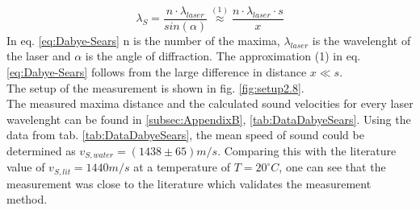         \begin{equation}
            \lambda_S = \frac{n \cdot \lambda_{laser}}{sin(\alpha)} \overset{(1)}{\approx} \frac{n \cdot \lambda_{laser} \cdot s}{x}
        \label{eq:Dabye-Sears}
        \end{equation}
        \noindent
        In eq. \ref{eq:Dabye-Sears} n is the number of the maxima, $\lambda_{laser}$ is the wavelenght of the laser and $\alpha$ is the angle of diffraction.
        The approximation (1) in eq. \ref{eq:Dabye-Sears} follows from the large difference in distance $x \ll s$. \\
        The setup of the measurement is shown in fig. \ref{fig:setup2.8}. \\
        The measured maxima distance and the calculated sound velocities for every laser wavelenght can be found in \ref{subsec:AppendixB}, \ref{tab:DataDabyeSears}.
        Using the data from tab. \ref{tab:DataDabyeSears}, the mean speed of sound could be determined as $v_{S,water} = (1438 \pm 65) m/s$. Comparing this with the
        literature value of $v_{S,lit} = 1440 m/s$ at a temperature of $T = 20 ^\circ C$, one can see that the measurement was close to the literature which
        validates the measurement method.

